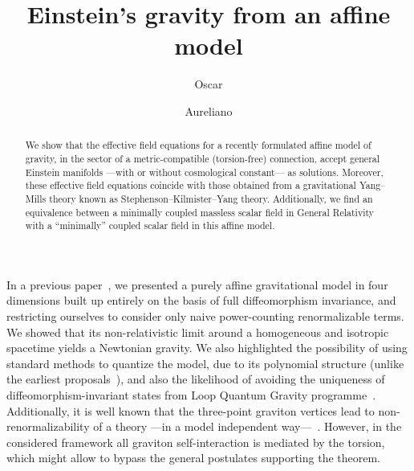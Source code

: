 \documentclass[aps,prl,twocolumn,superscriptaddress,showpacs,showkeys]{revtex4-1}
\begin{document}
\title{Einstein's gravity from an affine model}

\author{Oscar }

\author{Aureliano }


\begin{abstract}
  We show that the effective field equations for a recently formulated affine model of gravity, in the sector of a metric-compatible (torsion-free) connection, accept general Einstein manifolds ---with or without cosmological constant--- as solutions. Moreover, these effective field equations coincide with those obtained from a gravitational Yang--Mills theory known as Stephenson--Kilmister--Yang theory. Additionally, we find an equivalence between a minimally coupled massless scalar field in General Relativity with a ``minimally'' coupled scalar field in this affine model.
\end{abstract}



\maketitle

In a previous paper~\cite{Skirzewski:2014eta}, we presented a purely affine gravitational model in four dimensions built up entirely on the basis of full diffeomorphism invariance, and restricting ourselves to consider only naive power-counting renormalizable terms. We showed that its non-relativistic limit around a homogeneous and isotropic spacetime yields a Newtonian gravity. We also highlighted the possibility of using standard methods to quantize the model, due to its polynomial structure (unlike the earliest proposals~\cite{Eddington1923math,schrodinger1950space}), and also the likelihood of avoiding the uniqueness of diffeomorphism-invariant states from Loop Quantum Gravity programme~\cite{Lewandowski:2005jk}. Additionally, it is well known that the three-point graviton vertices lead to non-renormalizability of a theory ---in a model independent way---~\cite{McGady:2013sga,Camanho:2014apa}. However, in the considered framework all graviton self-interaction is mediated by the torsion, which might allow to bypass the general postulates supporting the theorem.
\end{document}
